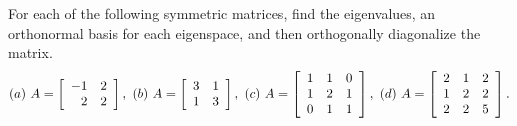 \documentclass{ximera}
\begin{document}
\begin{exercise}
  For each of the following symmetric matrices, find the eigenvalues,
  an orthonormal basis for each eigenspace, and then orthogonally
  diagonalize the matrix.
  \begin{equation*}
    (a)\quad
    A = \startmat{rr}
      -1 & 2 \\
      2  & 2 \\
    \stopmat,\quad
    (b)\quad
    A = \startmat{rr}
      3 & 1 \\
      1 & 3 \\
    \stopmat,\quad
    (c)\quad
    A = \startmat{rrr}
      1 & 1 & 0 \\
      1 & 2 & 1 \\
      0 & 1 & 1 \\
    \stopmat,\quad
    (d)\quad
    A = \startmat{rrr}
      2 & 1 & 2 \\
      1 & 2 & 2 \\
      2 & 2 & 5 \\
    \stopmat.
  \end{equation*}
  \begin{solution}
\end{solution}
\end{exercise}
\end{document}
